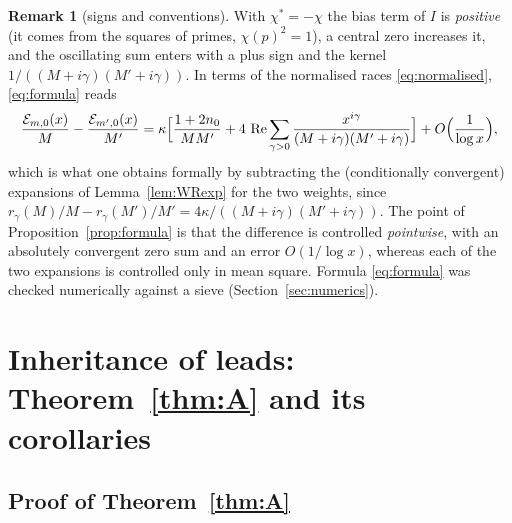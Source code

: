 \documentclass[11pt]{amsart}
\theoremstyle{definition}
\newtheorem{remark}[theorem]{Remark}
\numberwithin{equation}{section}
\newcommand{\cE}{\mathcal E}
\newcommand{\re}{\operatorname{Re}}
\begin{document}
\begin{remark}[signs and conventions]\label{rem:signs}
With $\chi^*=-\chi$ the bias term of $I$ is \emph{positive} (it comes
from the squares of primes, $\chi(p)^2=1$), a central zero increases
it, and the oscillating sum enters with a plus sign and the kernel
$1/((M+i\gamma)(M'+i\gamma))$. In terms of the normalised races
\eqref{eq:normalised}, \eqref{eq:formula} reads
\begin{equation}\label{eq:formula-normalised}
\frac{\cE_{m,0}(x)}{M}-\frac{\cE_{m',0}(x)}{M'}
=\kappa\Bigl[\frac{1+2n_0}{MM'}
+4\,\re\sum_{\gamma>0}\frac{x^{i\gamma}}{(M+i\gamma)(M'+i\gamma)}\Bigr]
+O\Bigl(\frac1{\log x}\Bigr),
\end{equation}
which is what one obtains formally by subtracting the (conditionally
convergent) expansions of Lemma~\ref{lem:WRexp} for the two weights,
since $r_\gamma(M)/M-r_\gamma(M')/M'=4\kappa/((M+i\gamma)(M'+i\gamma))$.
The point of Proposition~\ref{prop:formula} is that the difference is
controlled \emph{pointwise}, with an absolutely convergent zero sum
and an error $O(1/\log x)$, whereas each of the two expansions is
controlled only in mean square. Formula \eqref{eq:formula} was checked
numerically against a sieve (Section~\ref{sec:numerics}).
\end{remark}

\section{Inheritance of leads: Theorem~\ref{thm:A} and its corollaries}
\label{sec:thmA}

\subsection{Proof of Theorem~\ref{thm:A}}
\end{document}
